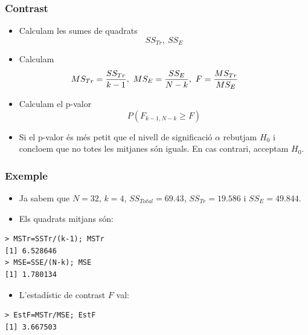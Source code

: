 \documentclass[12pt,t]{beamer}
\renewcommand{\geq}{\geqslant}
\theoremstyle{plain}
\theoremstyle{definition}
\begin{document}
\begin{frame}
\frametitle{Contrast}

\begin{itemize}
\item Calculam les sumes de quadrats 
$$
SS_{Tr},\ SS_E
$$

\item Calculam 
$$
\hspace*{-5ex} MS_{Tr}=\frac{SS_{Tr}}{k-1},\
MS_E=\frac{SS_E}{N-k},\ F=\frac{MS_{Tr}}{MS_E}
$$

\item Calculam el p-valor
$$
P(F_{k-1,N-k}\geq F)
$$

\item Si el p-valor és més petit que el nivell de significació $\alpha$  rebutjam $H_0$ i concloem que no totes les mitjanes són iguals. En cas contrari, acceptam $H_0$.
\end{itemize}
\end{frame}

\begin{frame}[fragile]
\frametitle{Exemple}\vspace*{-1ex}

\begin{itemize}
\item Ja sabem que $N=32$, $k=4$,   $SS_{Total}=69.43$,
$SS_{Tr}=19.586$ i $SS_E=49.844$.
\medskip

\item Els quadrats mitjans són:
\end{itemize}

\begin{lstlisting}
> MSTr=SSTr/(k-1); MSTr
[1] 6.528646
> MSE=SSE/(N-k); MSE
[1] 1.780134
\end{lstlisting}
\pause\medskip

\begin{itemize}
\item L'estadístic de contrast $F$ val:
\end{itemize}
\begin{lstlisting}
> EstF=MSTr/MSE; EstF
[1] 3.667503
\end{lstlisting}
\end{frame}
\end{document}
